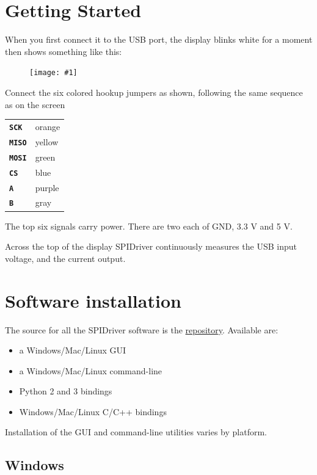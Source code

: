 \documentclass{article}
\newcommand{\png}[1]{
\begin{figure}[H]
\begin{center}
\texttt{[image: \#1]}
\end{center}
\end{figure}
}
\newcommand{\mach}[1]{\texttt{\textbf{#1}}}
\newcommand{\gap}{\vspace{10pt}}
\begin{document}
\newpage
\section{Getting Started}

When you first connect it to the USB port, the display blinks white for a moment then shows something like this:

\png{img/spidriver/spidriver-close}

Connect the six colored hookup jumpers as shown,
following the same sequence as on the screen

\gap
\begin{center}
\begin{tabular}{ll}
\hline
\mach{SCK}  & orange \\
\mach{MISO} & yellow \\
\mach{MOSI} & green  \\
\mach{CS}   & blue   \\
\mach{A}    & purple \\
\mach{B}    & gray   \\
\hline
\end{tabular}
\end{center}
\gap

The top six signals carry power. There are two each of GND, 3.3 V and 5 V.

Across the top of the display SPIDriver continuously measures the USB input voltage,
and the current output.

\newpage
\section{Software installation}

The source for all the SPIDriver software is the
\href{https://github.com/jamesbowman/spidriver}{repository}.
Available are:

\begin{itemize}
\item a Windows/Mac/Linux GUI
\item a Windows/Mac/Linux command-line
\item Python 2 and 3 bindings
\item Windows/Mac/Linux C/C++ bindings
\end{itemize}

Installation of the GUI and command-line utilities varies by platform.

\subsection{Windows}
\end{document}

